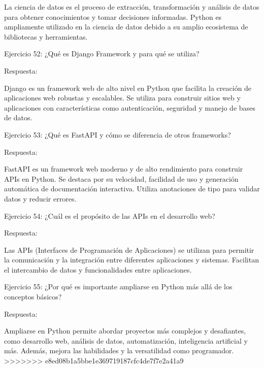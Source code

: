 \documentclass[
  a4paper,
  onepage,
  openany]{scrreprt}
\begin{document}
La ciencia de datos es el proceso de extracción, transformación y
análisis de datos para obtener conocimientos y tomar decisiones
informadas. Python es ampliamente utilizado en la ciencia de datos
debido a su amplio ecosistema de bibliotecas y herramientas.

Ejercicio 52: ¿Qué es Django Framework y para qué se utiliza?

Respuesta:

Django es un framework web de alto nivel en Python que facilita la
creación de aplicaciones web robustas y escalables. Se utiliza para
construir sitios web y aplicaciones con características como
autenticación, seguridad y manejo de bases de datos.

Ejercicio 53: ¿Qué es FastAPI y cómo se diferencia de otros frameworks?

Respuesta:

FastAPI es un framework web moderno y de alto rendimiento para construir
APIs en Python. Se destaca por su velocidad, facilidad de uso y
generación automática de documentación interactiva. Utiliza anotaciones
de tipo para validar datos y reducir errores.

Ejercicio 54: ¿Cuál es el propósito de las APIs en el desarrollo web?

Respuesta:

Las APIs (Interfaces de Programación de Aplicaciones) se utilizan para
permitir la comunicación y la integración entre diferentes aplicaciones
y sistemas. Facilitan el intercambio de datos y funcionalidades entre
aplicaciones.

Ejercicio 55: ¿Por qué es importante ampliarse en Python más allá de los
conceptos básicos?

Respuesta:

Ampliarse en Python permite abordar proyectos más complejos y
desafiantes, como desarrollo web, análisis de datos, automatización,
inteligencia artificial y más. Además, mejora las habilidades y la
versatilidad como programador.
\textgreater\textgreater\textgreater\textgreater\textgreater\textgreater\textgreater{}
e8ed08b1a5bbe1e369719187cfc4de7f7e2a41a9
\end{document}
